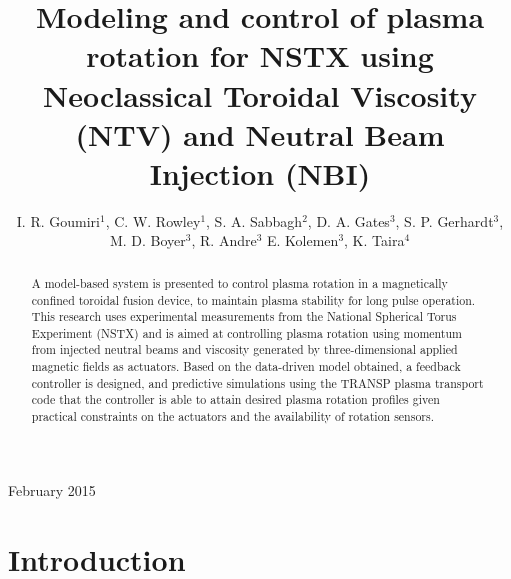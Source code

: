 \documentclass[12pt]{iopart}
\begin{document}
\title[Modeling and control of plasma rotation using NTV and NBI]{Modeling and control of plasma rotation for NSTX using Neoclassical Toroidal Viscosity (NTV) and Neutral Beam Injection (NBI)}

\author{I. R. Goumiri$^1$, C. W. Rowley$^1$, S. A. Sabbagh$^2$, D. A. Gates$^3$, S. P. Gerhardt$^3$, M. D. Boyer$^3$, R. Andre$^3$  E. Kolemen$^3$, K. Taira$^4$ }

 \address{$^1$ Department of Mechanical and Aerospace Engineering, Princeton University, Princeton, NJ 08544, USA}
 \address{$^2$ Department of Applied Physics and Applied Mathematics, Columbia University, New York, NY 10027, USA}
\address{$^3$ Princeton Plasma Physics Laboratory, Princeton, NJ 08544, USA}
\address{$^4$ Florida Center for Advanced Aero-Propulsion, Florida State University, Tallahassee, Florida 32310, USA}

\vspace{10pt}
\begin{indented}
\item[]February 2015
\end{indented}

\begin{abstract}
A model-based system is presented to control plasma rotation in a magnetically confined toroidal fusion device, to maintain plasma stability for long pulse operation. This research uses experimental measurements from the National Spherical Torus Experiment (NSTX) and is aimed at controlling plasma rotation using momentum from injected neutral beams and viscosity generated by three-dimensional applied magnetic fields as actuators. Based on the data-driven model obtained, a feedback controller is designed, and predictive simulations using the TRANSP plasma transport code that the controller is able to attain desired plasma rotation profiles given practical constraints on the actuators and the availability of rotation sensors.
\end{abstract}



\section{Introduction}
\end{document}

